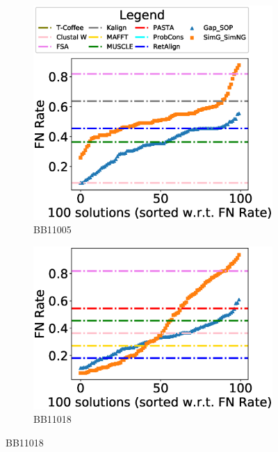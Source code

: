 \begin{figure}[!htbp]
	\begin{adjustwidth}{-1cm}{-1cm}
		\centering
		\begin{subfigure}[b]{0.26\textwidth}
			\includegraphics[width=\columnwidth]{Figure/summary/precomputedInit/Balibase/BB11005_fnrate_density_single_run}
			\caption{BB11005}
\end{subfigure}    
		\begin{subfigure}[b]{0.26\textwidth}
			\includegraphics[width=\columnwidth]{Figure/summary/precomputedInit/Balibase/BB11018_fnrate_density_single_run}
			\caption{BB11018}
\end{subfigure}

\end{adjustwidth}
\end{figure}
